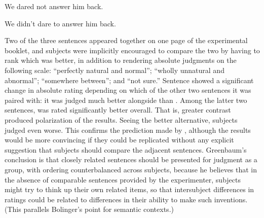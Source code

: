 \ea\label{ex:5:14} 
We dared not answer him back.
\z

\ea\label{ex:5:15} 
We didn't dare to answer him back.
\z

\noindent
Two of the three sentences appeared together on one page of the experimental booklet, and subjects were implicitly encouraged to compare the two by having to
rank which was better, in addition to rendering absolute judgments on the following scale: ``perfectly natural and normal''; ``wholly unnatural and abnormal''; ``somewhere between''; and ``not sure.'' Sentence  showed a significant change in absolute rating depending on which of the other two sentences it was paired with: it was judged much better alongside  than . Among the latter two sentences,  was rated significantly better overall. That is, greater contrast produced polarization of the results. Seeing the better alternative, subjects judged  even worse. This confirms the prediction made by \citet{Bever1970a}, although the results would be more convincing if they could be replicated without any explicit suggestion that subjects should compare the adjacent sentences. Greenbaum's conclusion is that closely related sentences should be presented for judgment as a group, with ordering counterbalanced across subjects, because he believes that in the absence of comparable sentences provided by the experimenter, subjects might try to think up their own related items, so that intersubject differences in ratings could be related to differences in their ability to make such inventions. (This parallels Bolinger's point for semantic contexts.)

